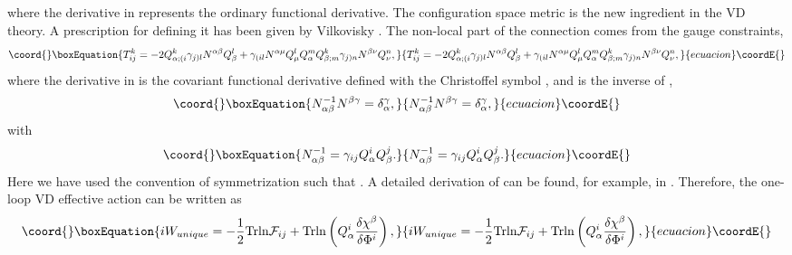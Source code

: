 \documentclass[a4paper,aps,preprint,groupedaddress,showpacs]{revtex4}
\begin{document}
where the derivative in 
\coordHE{} represents
the ordinary functional derivative. The configuration  space metric 
is the new ingredient in the VD theory. A prescription for defining
it  has been given by Vilkovisky \cite{GV}. The 
non-local part \coordHE{} of the connection comes from the gauge constraints,
\begin{equation}\coord{}\boxEquation{
T^{k}_{ij}=-2Q^{k}_{\alpha;(i}\gamma_{j)l}N^{\alpha\beta}
Q^{l}_{\beta}+\gamma_{(il}N^{\alpha\mu}Q^{l}_{\mu}Q^{m}_{\alpha}
Q^{k}_{\beta;m}\gamma_{j)n}N^{\beta\nu}Q^{n}_{\nu},
}{
T^{k}_{ij}=-2Q^{k}_{\alpha;(i}\gamma_{j)l}N^{\alpha\beta}
Q^{l}_{\beta}+\gamma_{(il}N^{\alpha\mu}Q^{l}_{\mu}Q^{m}_{\alpha}
Q^{k}_{\beta;m}\gamma_{j)n}N^{\beta\nu}Q^{n}_{\nu},
}{ecuacion}\coordE{}\end{equation}
where the derivative in \coordHE{} is the covariant 
functional derivative defined with the Christoffel symbol
\coordHE{}, and
\coordHE{} is the inverse of \coordHE{},
\begin{equation}\coord{}\boxEquation{
N^{-1}_{\alpha\beta}N^{\beta\gamma}=\delta^{\gamma}_{\alpha},
}{
N^{-1}_{\alpha\beta}N^{\beta\gamma}=\delta^{\gamma}_{\alpha},
}{ecuacion}\coordE{}\end{equation}
with
\begin{equation}\coord{}\boxEquation{
N^{-1}_{\alpha\beta}=\gamma_{ij}Q^{i}_{\alpha}Q^{j}_{\beta}.
}{
N^{-1}_{\alpha\beta}=\gamma_{ij}Q^{i}_{\alpha}Q^{j}_{\beta}.
}{ecuacion}\coordE{}\end{equation}
Here we have used the convention of symmetrization such that
\coordHE{}. A detailed
derivation of \coordHE{} can be found, for example, in \cite{GK}. 
Therefore, the one-loop VD effective action can
be written as
\begin{equation}\coord{}\boxEquation{
iW_{unique}=-\frac{1}{2}{\rm Trln}{\cal F}_{ij}+
{\rm Trln}\left(Q^{i}_{\alpha}
\frac{\delta\chi^{\beta}}{\delta\Phi^{i}}\right),
\label{VDEA}
}{
iW_{unique}=-\frac{1}{2}{\rm Trln}{\cal F}_{ij}+
{\rm Trln}\left(Q^{i}_{\alpha}
\frac{\delta\chi^{\beta}}{\delta\Phi^{i}}\right),
}{ecuacion}\coordE{}\end{equation}
\end{document}
